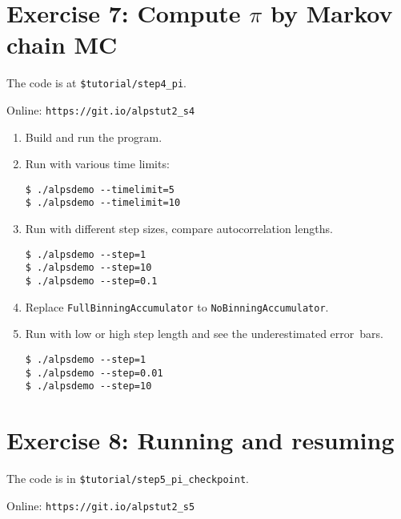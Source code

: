 \documentclass[12pt]{article}
\newcommand{\code}[1]{\texttt{#1}}
\begin{document}
\section*{Exercise 7: Compute $\pi$ by Markov chain MC}

The code is at \texttt{\color{ballblue}\$tutorial/step4\_pi}.

Online: \nolinkurl{https://git.io/alpstut2_s4}

\begin{enumerate}
\item Build and run the program.
\item Run with various time limits:
  \begin{lstlisting}
$ ./alpsdemo --timelimit=5
$ ./alpsdemo --timelimit=10
  \end{lstlisting}
\item Run with different step sizes, compare autocorrelation lengths.
  \begin{lstlisting}
$ ./alpsdemo --step=1 
$ ./alpsdemo --step=10
$ ./alpsdemo --step=0.1
  \end{lstlisting} %
\item Replace \code{FullBinningAccumulator} to 
\code{NoBinningAccumulator}.
\item Run with low or high step length and see the underestimated error~bars.
  \begin{lstlisting}
$ ./alpsdemo --step=1
$ ./alpsdemo --step=0.01
$ ./alpsdemo --step=10
  \end{lstlisting} %
\end{enumerate}


\section*{Exercise 8: Running and resuming}

The code is in \texttt{\color{ballblue}\$tutorial/step5\_pi\_checkpoint}.

Online: \nolinkurl{https://git.io/alpstut2_s5}
\end{document}
